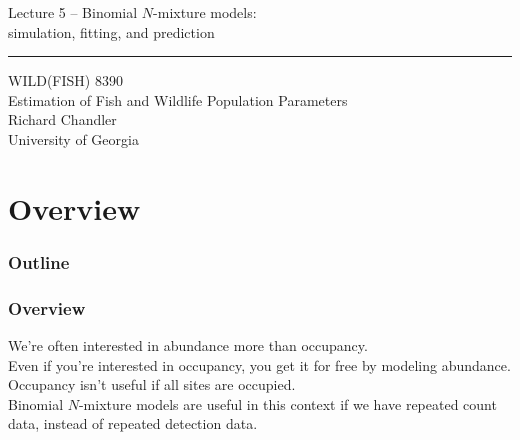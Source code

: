 \documentclass[color=usenames,dvipsnames]{beamer}\usepackage[]{graphicx}\usepackage[]{color}
\begin{document}
\begin{frame}[plain]
  \LARGE
  \centering
  {\LARGE Lecture 5 -- Binomial $N$-mixture models: \\ simulation, fitting, and prediction} \\
  {\color{default} \rule{\textwidth}{0.1pt}}
  \vfill
  \large
  WILD(FISH) 8390 \\
  Estimation of Fish and Wildlife Population Parameters \\
  \vfill
  \large
  Richard Chandler \\
  University of Georgia \\
\end{frame}






\section{Overview}



\begin{frame}[plain]
  \frametitle{Outline}
  \Large
\end{frame}



\begin{frame}
  \frametitle{Overview}
  We're often interested in abundance more than occupancy. \\
  \pause
  \vfill
  Even if you're interested in occupancy, you get it for free by modeling abundance. \\
  \pause
  \vfill
  Occupancy isn't useful if all sites are occupied. \\
  \pause
  \vfill
  Binomial $N$-mixture models are useful in this context if we have
  repeated count data, instead of repeated detection data. 
\end{frame}
\end{document}
